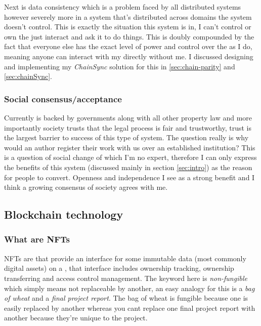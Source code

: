 Next is data consistency which is a problem faced by all distributed systems however severely more in a system that's distributed across domains the system doesn't control. This is exactly the situation this system is in, I can't control or own the  just interact and ask it to do things. This is doubly compounded by the fact that everyone else has the exact level of power and control over the  as I do, meaning anyone can interact with my  directly without me. I discussed designing and implementing my \textit{ChainSync} solution for this in \ref{sec:chain-parity} and \ref{sec:chainSync}. %

\subsubsection{Social consensus/acceptance}

Currently  is backed by governments along with all other property law and more importantly society trusts that the legal process is fair and trustworthy, trust is the largest barrier to success of this type of system. The question really is why would an author register their work with us over an established institution? This is a question of social change of which I'm no expert, therefore I can only express the benefits of this system (discussed mainly in section \ref{sec:intro}) as the reason for people to convert. Openness and independence I see as a strong benefit and I think a growing consensus of society agrees with me.  

\subsection{Blockchain technology}

\subsubsection{What are NFTs}

NFTs are  that provide an interface for some immutable data (most commonly digital assets) on a , that interface includes ownership tracking, ownership transferring and access control management. The keyword here is \textit{non-fungible} which simply means not replaceable by another, an easy analogy for this is a \textit{bag of wheat} and a \textit{final project report}. The bag of wheat is fungible because one is easily replaced by another whereas you cant replace one final project report with another because they're unique to the project.


